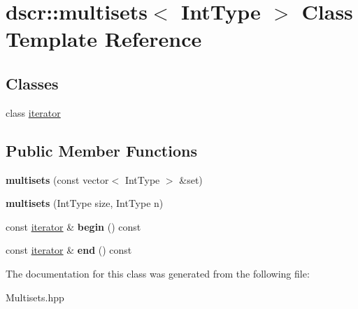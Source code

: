 \hypertarget{classdscr_1_1multisets}{\section{dscr\-:\-:multisets$<$ Int\-Type $>$ Class Template Reference}
\label{classdscr_1_1multisets}
}
\subsection*{Classes}
\begin{DoxyCompactItemize}
\item 
class \hyperlink{classdscr_1_1multisets_1_1iterator}{iterator}
\end{DoxyCompactItemize}
\subsection*{Public Member Functions}
\begin{DoxyCompactItemize}
\item 
\hypertarget{classdscr_1_1multisets_a0e63615ef697c8e1f490ff984f03f6d3}{{\bfseries multisets} (const vector$<$ Int\-Type $>$ \&set)}\label{classdscr_1_1multisets_a0e63615ef697c8e1f490ff984f03f6d3}

\item 
\hypertarget{classdscr_1_1multisets_ae9c6cebb3fb1ca70ca68f791dca5d820}{{\bfseries multisets} (Int\-Type size, Int\-Type n)}\label{classdscr_1_1multisets_ae9c6cebb3fb1ca70ca68f791dca5d820}

\item 
\hypertarget{classdscr_1_1multisets_a665038c64dcdcc04414ceb54c9f30643}{const \hyperlink{classdscr_1_1multisets_1_1iterator}{iterator} \& {\bfseries begin} () const }\label{classdscr_1_1multisets_a665038c64dcdcc04414ceb54c9f30643}

\item 
\hypertarget{classdscr_1_1multisets_ae0d0b1760de6f70b206c3cd73590ed51}{const \hyperlink{classdscr_1_1multisets_1_1iterator}{iterator} \& {\bfseries end} () const }\label{classdscr_1_1multisets_ae0d0b1760de6f70b206c3cd73590ed51}

\end{DoxyCompactItemize}


The documentation for this class was generated from the following file\-:\begin{DoxyCompactItemize}
\item 
Multisets.\-hpp\end{DoxyCompactItemize}
